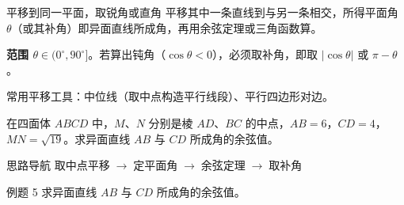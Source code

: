 \documentclass{exam-zh}
\begin{document}
\clearpage
{}


\begin{eduSolutionBox}{平移到同一平面，取锐角或直角}
  \begingroup
  \setlength{\parskip}{2.5mm}
平移其中一条直线到与另一条相交，所得平面角 $\theta$（或其补角）即异面直线所成角，再用余弦定理或三角函数算。\par
\textbf{范围 $\theta\in(0^\circ,90^\circ]$}。若算出钝角（$\cos\theta<0$），必须取补角，即取 $|\cos\theta|$ 或 $\pi-\theta$。\par
常用平移工具：中位线（取中点构造平行线段）、平行四边形对边。\par
  \endgroup
\end{eduSolutionBox}




\begin{eduProblemBlock}[例题 5]
在四面体 $ABCD$ 中，$M$、$N$ 分别是棱 $AD$、$BC$ 的中点，$AB=6$，$CD=4$，$MN=\sqrt{19}$。求异面直线 $AB$ 与 $CD$ 所成角的余弦值。
\end{eduProblemBlock}





\begin{eduAuxItem}{思路导航}
取中点平移$\;\to\;$定平面角$\;\to\;$余弦定理$\;\to\;$取补角\end{eduAuxItem}




\begin{eduSubQuestionItem}{例题 5}
求异面直线 $AB$ 与 $CD$ 所成角的余弦值。\end{eduSubQuestionItem}

\begin{eduDualExplain}
  \begin{eduExplainLeft}
  \end{eduExplainLeft}

  \begin{eduExplainRight}
  \end{eduExplainRight}
\end{eduDualExplain}
\end{document}
